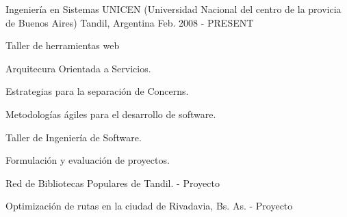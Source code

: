


\begin{cventries}


\cventry
{Ingeniería en Sistemas} %
{UNICEN (Universidad Nacional del centro de la provicia de Buenos Aires)} %
{Tandil, Argentina} %
{Feb. 2008 - PRESENT} %
{ %
\begin{cvitems}
\item {Taller de herramientas web}
\item {Arquitecura Orientada a Servicios.}
\item {Estrategias para la separación de Concerns.}
\item {Metodologías ágiles para el desarrollo de software.}
\item {Taller de Ingeniería de Software.}
\item {Formulación y evaluación de proyectos.}
\item {Red de Bibliotecas Populares de Tandil. - Proyecto}
\item {Optimización de rutas en la ciudad de Rivadavia, Bs. As. - Proyecto}
\end{cvitems}
}


\end{cventries}
